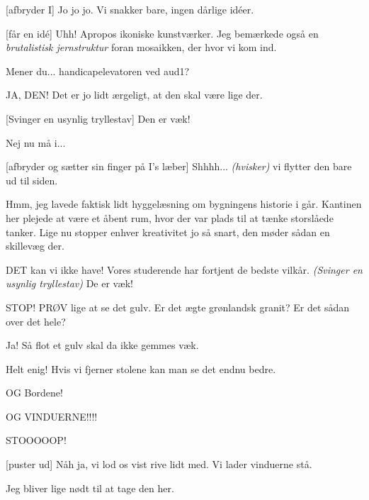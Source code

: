 \documentclass[a4paper,11pt]{article}
\begin{document}
\begin{sketch}
[afbryder I] Jo jo jo. Vi snakker bare, ingen dårlige idéer. 

[får en idé] Uhh! Apropos ikoniske kunstværker. Jeg bemærkede også en \textit{brutalistisk jernstruktur} foran mosaikken, der hvor vi kom ind.

 Mener du... handicapelevatoren ved aud1?

 JA, DEN! Det er jo lidt ærgeligt, at den skal være lige der.

[Svinger en usynlig tryllestav] Den er væk!

 Nej nu må i...

[afbryder og sætter sin finger på I's læber] Shhhh... \textit{(hvisker)} vi flytter den bare ud til siden. 


 Hmm, jeg lavede faktisk lidt hyggelæsning om bygningens historie i går. Kantinen her plejede at være et åbent rum, hvor der var plads til at tænke storslåede tanker. Lige nu stopper enhver kreativitet jo så snart, den møder sådan en skillevæg der.

 DET kan vi ikke have! Vores studerende har fortjent de bedste vilkår. \textit{(Svinger en usynlig tryllestav)} De er væk!


 STOP! PRØV lige at se det gulv. Er det ægte grønlandsk granit? Er det sådan over det hele? 


 Ja! Så flot et gulv skal da ikke gemmes væk.

 Helt enig! Hvis vi fjerner stolene kan man se det endnu bedre.

 OG Bordene!

 OG VINDUERNE!!!!

 STOOOOOP! 


[puster ud] Nåh ja, vi lod os vist rive lidt med. Vi lader vinduerne stå.


 Jeg bliver lige nødt til at tage den her.


\end{sketch}
\end{document}
